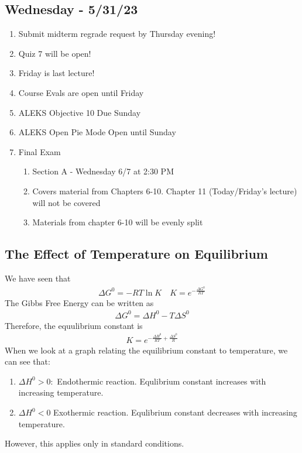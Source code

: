 \documentclass{article}  %
\begin{document}
\subsection*{Wednesday - 5/31/23}
\begin{enumerate}
    \item Submit midterm regrade request by Thursday evening!
    \item Quiz 7 will be open!
    \item Friday is last lecture!
    \item Course Evals are open until Friday
    \item ALEKS Objective 10 Due Sunday
    \item ALEKS Open Pie Mode Open until Sunday
    \item Final Exam
        \begin{enumerate}
            \item Section A - Wednesday 6/7 at 2:30 PM
            \item Covers material from Chapters 6-10. Chapter 11 (Today/Friday's lecture) will not be covered
            \item Materials from chapter 6-10 will be evenly split
        \end{enumerate}
\end{enumerate}

\subsection*{The Effect of Temperature on Equilibrium}
We have seen that 
\begin{equation*}
    \begin{aligned}
        \Delta G^0 = -RT\ln K \quad K = e^{-\frac{\Delta G^0}{RT}}
    \end{aligned}
\end{equation*}
The Gibbs Free Energy can be written as
\begin{equation*}
    \begin{aligned}
        \Delta G^0 = \Delta H^0 - T\Delta S^0
    \end{aligned}
\end{equation*}
Therefore, the equulibrium constant is
\begin{equation*}
    \begin{aligned}
        K = e^{-\frac{\Delta H^0}{RT} + \frac{\Delta S^0}{R}}
    \end{aligned}
\end{equation*}
When we look at a graph relating the equilibrium constant to temperature, we can see that:
\begin{enumerate}
    \item $\Delta H^0 > 0:$ Endothermic reaction. Equlibrium constant increases with increasing temperature.
    \item $\Delta H^0 < 0$ Exothermic  reaction. Equlibrium constant decreases with increasing temperature.
\end{enumerate}
However, this applies only in standard conditions.
\end{document}
